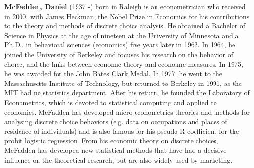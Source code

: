\textbf{McFadden, Daniel} (1937 -) born in Raleigh is an econometrician who received in 2000, with James Heckman, the Nobel Prize in Economics for his contributions to the theory and methods of discrete choice analysis. He obtained a Bachelor of Science in Physics at the age of nineteen at the University of Minnesota and a Ph.D.. in behavioral sciences (economics) five years later in 1962. In 1964, he joined the University of Berkeley and focuses his research on the behavior of choice, and the links between economic theory and economic measures. In 1975, he was awarded for the John Bates Clark Medal. In 1977, he went to the Massachusetts Institute of Technology, but returned to Berkeley in 1991, as the MIT had no statistics department. After his return, he founded the Laboratory of Econometrics, which is devoted to statistical computing and applied to economics. McFadden has developed micro-econometrics theories and methods for analysing discrete choice behaviors (e.g. data on occupations and places of residence of individuals) and is also famous for his pseudo-R coefficient for the probit logistic regression. From his economic theory on discrete choices, McFadden has developed new statistical methods that have had a decisive influence on the theoretical research, but are also widely used by marketing.

